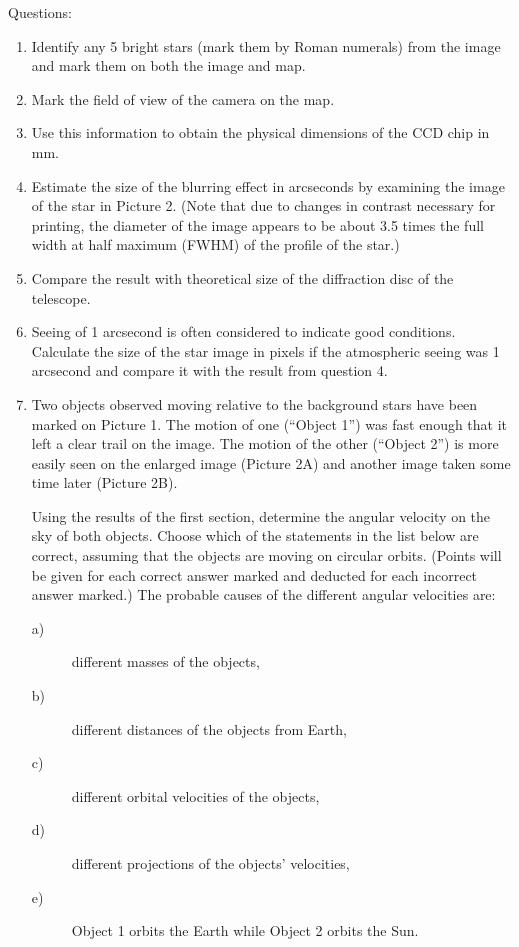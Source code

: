 Questions:

\begin{enumerate}
\item Identify any 5 bright stars (mark them by Roman numerals) from the
  image and mark them on both the image and map.
\item Mark the field of view of the camera on the map.
\item Use this information to obtain the physical dimensions of the CCD chip
  in mm.
\item Estimate the size of the blurring effect in arcseconds by examining
  the image of the star in Picture 2. (Note that due to changes in contrast
  necessary for printing, the diameter of the image appears to be about 3.5
  times the full width at half maximum (FWHM) of the profile of the star.)
\item Compare the result with theoretical size of the diffraction disc of
  the telescope.
\item Seeing of 1 arcsecond is often considered to indicate good conditions.
  Calculate the size of the star image in pixels if the atmospheric seeing
  was 1 arcsecond and compare it with the result from question 4.
\item Two objects observed moving relative to the background stars have been
  marked on Picture 1. The motion of one (``Object 1'') was fast enough that
  it left a clear trail on the image. The motion of the other (``Object 2'')
  is more easily seen on the enlarged image (Picture 2A) and another image
  taken some time later (Picture 2B).

  Using the results of the first section, determine the angular velocity on
  the sky of both objects. Choose which of the statements in the list below
  are correct, assuming that the objects are moving on circular orbits.
  (Points will be given for each correct answer marked and deducted for each
  incorrect answer marked.) The probable causes of the different angular
  velocities are:
  \begin{description}
  \item[a)] different masses of the objects,
  \item[b)] different distances of the objects from Earth,
  \item[c)] different orbital velocities of the objects,
  \item[d)] different projections of the objects' velocities,
  \item[e)] Object 1 orbits the Earth while Object 2 orbits the Sun.
  \end{description}
\end{enumerate}

